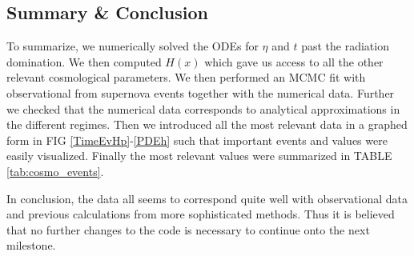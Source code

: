 \documentclass[%
reprint,
 amsmath,amssymb,
 aps,
]{revtex4-2}
\begin{document}
\subsection{Summary \& Conclusion}

To summarize, we numerically solved the ODEs for $\eta$ and $t$ past the radiation domination. We then computed $H(x)$ which gave us access to all the other relevant cosmological parameters. We then performed an MCMC fit with observational from supernova events together with the numerical data. Further we checked that the numerical data corresponds to analytical approximations in the different regimes. Then we introduced all the most relevant data in a graphed form in FIG \ref{TimeEvHp}-\ref{PDEh} such that important events and values were easily visualized. Finally the most relevant values were summarized in TABLE \ref{tab:cosmo_events}.

In conclusion, the data all seems to correspond quite well with observational data and previous calculations from more sophisticated methods. Thus it is believed that no further changes to the code is necessary to continue onto the next milestone. 
\end{document}
